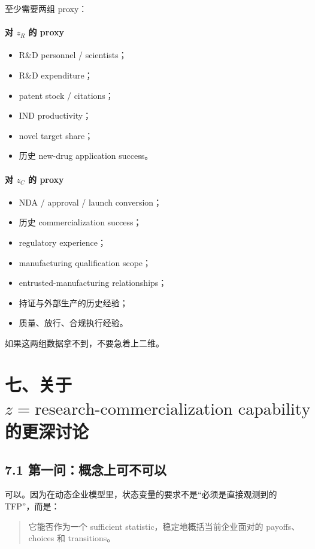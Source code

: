 \documentclass[12pt,fontset=none]{ctexart}
\begin{document}
至少需要两组 proxy：

\paragraph{对 $z_R$ 的 proxy}
\begin{itemize}[leftmargin=2em]
    \item R\&D personnel / scientists；
    \item R\&D expenditure；
    \item patent stock / citations；
    \item IND productivity；
    \item novel target share；
    \item 历史 new-drug application success。
\end{itemize}

\paragraph{对 $z_C$ 的 proxy}
\begin{itemize}[leftmargin=2em]
    \item NDA / approval / launch conversion；
    \item 历史 commercialization success；
    \item regulatory experience；
    \item manufacturing qualification scope；
    \item entrusted-manufacturing relationships；
    \item 持证与外部生产的历史经验；
    \item 质量、放行、合规执行经验。
\end{itemize}

如果这两组数据拿不到，不要急着上二维。

\section{七、关于 \texorpdfstring{$z=\text{research-commercialization capability}$}{z = research-commercialization capability} 的更深讨论}

\subsection{7.1 第一问：概念上可不可以}

可以。因为在动态企业模型里，状态变量的要求不是“必须是直接观测到的 TFP”，而是：

\begin{quote}
它能否作为一个 sufficient statistic，稳定地概括当前企业面对的 payoffs、choices 和 transitions。
\end{quote}
\end{document}
